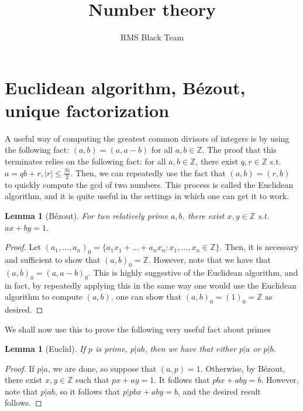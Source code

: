 \documentclass{article}
\theoremstyle{plain}
\newtheorem{lemma}[theorem]{Lemma}
\numberwithin{equation}{section}
\begin{document}
\title{Number theory}
\author{RMS Black Team}
\date{}
\maketitle

\section*{Euclidean algorithm, B\'ezout, unique factorization}

A useful way of computing the greatest common divisors of integers is by using the following fact: $(a, b) = (a, a - b)$ for all 
$a, b\in\mathbb{Z}$. 
The proof that this terminates relies on the following fact: for all $a, b\in\mathbb{Z}$, there exist $q,r\in\mathbb{Z}$ s.t. 
$a = qb + r, |r|\le \frac{|b|}{2}$. Then, we can repeatedly use the fact that $(a, b) = (r, b)$ to quickly compute the gcd of 
two numbers. This process is called the Euclidean algorithm, and it is quite useful in the settings in which one can get it to work. 

\begin{lemma}[B\'ezout]
For two relatively prime $a,b$, there exist $x,y\in\mathbb{Z}$ s.t. $ax + by = 1$. 
\end{lemma}

\begin{proof}
Let $(a_1, \dots, a_n)_0 = \{a_1x_1 + \dots + a_nx_n: x_1, \dots, x_n\in\mathbb{Z}\}.$ Then, it is necessary and sufficient to show
that $(a, b)_0 = \mathbb{Z}.$ However, note that we have that $(a, b)_0 = (a, a - b)_0.$ This is highly suggestive of the Euclidean
algorithm, and in fact, by repeatedly applying this in the same way one would use the Euclidean algorithm to compute $(a, b)$, one
can show that $(a, b)_0 = (1)_0 = \mathbb{Z}$ as desired.
\end{proof}

We shall now use this to prove the following very useful fact about primes

\begin{lemma}[Euclid]
If $p$ is prime, $p|ab$, then we have that either $p|a$ or $p|b$.
\end{lemma}
\begin{proof}
If $p|a$, we are done, so suppose that $(a, p) = 1$. Otherwise, by B\'ezout, there exist $x, y\in\mathbb{Z}$ such that 
$px + ay = 1$. It follows that $pbx + aby = b$. However, note that $p|ab$, so it follows that $p|pbx + aby = b$, and the desired
result follows.
\end{proof}
\end{document}
